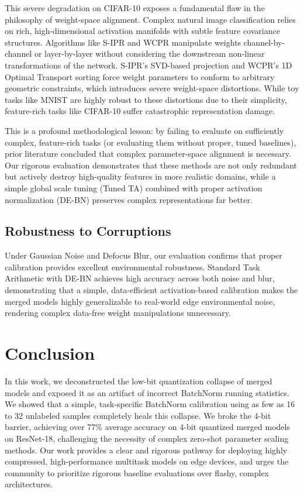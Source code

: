 \documentclass{article}
\theoremstyle{plain}
\theoremstyle{definition}
\theoremstyle{remark}
\begin{document}
This severe degradation on CIFAR-10 exposes a fundamental flaw in the philosophy of weight-space alignment. Complex natural image classification relies on rich, high-dimensional activation manifolds with subtle feature covariance structures. Algorithms like S-IPR and WCPR manipulate weights channel-by-channel or layer-by-layer without considering the downstream non-linear transformations of the network. S-IPR's SVD-based projection and WCPR's 1D Optimal Transport sorting force weight parameters to conform to arbitrary geometric constraints, which introduces severe weight-space distortions. While toy tasks like MNIST are highly robust to these distortions due to their simplicity, feature-rich tasks like CIFAR-10 suffer catastrophic representation damage.

This is a profound methodological lesson: by failing to evaluate on sufficiently complex, feature-rich tasks (or evaluating them without proper, tuned baselines), prior literature concluded that complex parameter-space alignment is necessary. Our rigorous evaluation demonstrates that these methods are not only redundant but actively destroy high-quality features in more realistic domains, while a simple global scale tuning (Tuned TA) combined with proper activation normalization (DE-BN) preserves complex representations far better.

\subsection{Robustness to Corruptions}
Under Gaussian Noise and Defocus Blur, our evaluation confirms that proper calibration provides excellent environmental robustness. Standard Task Arithmetic with DE-BN achieves high accuracy across both noise and blur, demonstrating that a simple, data-efficient activation-based calibration makes the merged models highly generalizable to real-world edge environmental noise, rendering complex data-free weight manipulations unnecessary.

\section{Conclusion}
\label{sec:conclusion}

In this work, we deconstructed the low-bit quantization collapse of merged models and exposed it as an artifact of incorrect BatchNorm running statistics. We showed that a simple, task-specific BatchNorm calibration using as few as 16 to 32 unlabeled samples completely heals this collapse. We broke the 4-bit barrier, achieving over 77\% average accuracy on 4-bit quantized merged models on ResNet-18, challenging the necessity of complex zero-shot parameter scaling methods. Our work provides a clear and rigorous pathway for deploying highly compressed, high-performance multitask models on edge devices, and urges the community to prioritize rigorous baseline evaluations over flashy, complex architectures.
\end{document}
